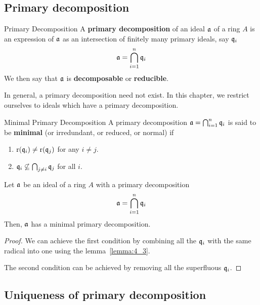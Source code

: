 \subsection{Primary decomposition}

\begin{definition}{Primary Decomposition}{}
	A \textbf{primary decomposition} of an ideal \(\mathfrak{a}\) of a ring \(A\)
	is an expression of \(\mathfrak{a}\) as an intersection of finitely many
	primary ideals, say \(\mathfrak{q}_i\)
	\[
		\mathfrak{a} = \bigcap_{i = 1}^{n} \mathfrak{q}_i
	\]
	We then say that \(\mathfrak{a}\) is \textbf{decomposable} or \textbf{reducible}.
\end{definition}

\begin{note}
	In general, a primary decomposition need not exist.
	In this chapter, we restrict ourselves to ideals which
	have a primary decomposition.
\end{note}

\begin{defn}{Minimal Primary Decomposition}{}
	A primary decomposition \(\mathfrak{a} = \bigcap_{i = 1}^{n} \mathfrak{q}_i\) is said
	to be \textbf{minimal} (or irredundant, or reduced, or normal) if
	\begin{enumerate}
		\item \(\operatorname{r}(\mathfrak{q}_i) \neq \operatorname{r}(\mathfrak{q}_j)\) for any \(i \neq j\).
		\item \(\mathfrak{q}_i \not\subseteq \bigcap_{j \neq i} \mathfrak{q}_j\)
			for all \(i\).
	\end{enumerate}
\end{defn}

\begin{proposition}{}{}
	Let \(\mathfrak{a}\) be an ideal of a ring \(A\) with a primary decomposition
	\[
		\mathfrak{a} = \bigcap_{i = 1}^{n} \mathfrak{q}_i
	\]
	Then, \(\mathfrak{a}\) has a minimal primary decomposition.
\end{proposition}
\begin{proof}
	We can achieve the first condition by combining all the
	\(\mathfrak{q}_i\) with the same radical into one using the
	lemma~\ref{lemma:4_3}.

	The second condition can be achieved by removing all the
	superfluous \(\mathfrak{q}_i\).
\end{proof}


\subsection{Uniqueness of primary decomposition}

